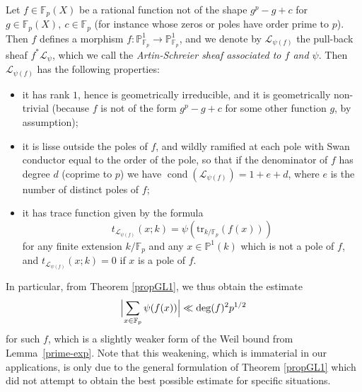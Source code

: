 \documentclass[12pt,a4paper,reqno]{amsart}
\numberwithin{equation}{section}
\DeclareMathOperator*\cond{cond}
\theoremstyle{plain}
\theoremstyle{definition}
\newcommand\F{\mathbb{F}}
\newcommand\C{\mathbb{C}}
\newcommand\tr{\mathrm{tr}}
\newcommand\mcL{\mathcal{L}}
\newcommand\Gm{\mathbb{G}_m}
\newcommand\Pl{\mathbb{P}^1}
\newcommand\Fp{\F_{p}}
\newcommand\Fq{\F_{q}}
\begin{document}
Let $f\in \Fp(X)$ be a rational function not of the shape $g^p-g+c$
for $g\in\Fp(X),\ c\in\Fp$ (for instance whose zeros or poles have
order prime to $p$). Then $f$ defines a morphism $f\colon \Pl_{\F_p}
\rightarrow \Pl_{\F_p}$, and we denote by $\mcL_{\psi(f)}$ the
pull-back sheaf $f^*\mcL_{\psi}$, which we call the
\emph{Artin-Schreier sheaf associated to $f$ and $\psi$}. Then
$\mcL_{\psi(f)}$ has the following properties:
\begin{itemize}
\item it has rank $1$, hence is geometrically irreducible, and it is
  geometrically non-trivial (because $f$ is not of the form $g^p-g+c$
  for some other function $g$, by assumption);
\item it is lisse outside the poles of $f$, and wildly ramified at
  each pole with Swan conductor equal to the order of the pole, so
  that if the denominator of $f$ has degree $d$ (coprime to $p$) we
  have $\cond(\mcL_{\psi(f)})=1+e+d$, where $e$ is the number of
  distinct poles of $f$;
\item it has trace function given by the formula
$$
t_{\mcL_{\psi(f)}}(x;k)=\psi(\tr_{k/\Fp}(f(x)))
$$
for any finite extension $k/\Fp$ and any $x\in\Pl(k)$ which is not a
pole of $f$, and $t_{\mcL_{\psi(f)}}(x;k)=0$ if $x$ is a pole of $f$.
\end{itemize}

In particular, from Theorem \ref{propGL1}, we thus obtain the
estimate
$$ 
\Bigl|\sum_{x\in \Fp}\psi(f(x))\Bigr| \ll \deg(f)^2p^{1/2}
$$
for such $f$, which is a slightly weaker form of the Weil bound from
Lemma~\ref{prime-exp}. Note that this weakening, which is immaterial
in our applications, is only due to the general formulation of
Theorem \ref{propGL1} which did not attempt to obtain the best
possible estimate for specific situations.

%
 
\end{document}

